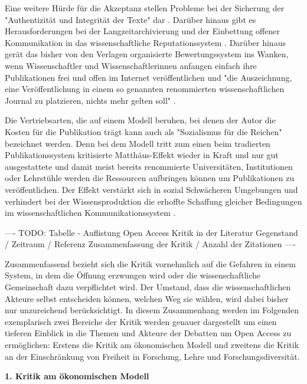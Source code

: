 Eine weitere Hürde für die Akzeptanz stellen Probleme bei der Sicherung der "Authentizität und Integrität der Texte" dar \cite{weishaupt_2009_goldenOA} \cite[:191]{Fehling_2014}. Darüber hinaus gibt es Herausforderungen bei der Langzeitarchivierung \cite{hagner_2015_sache_buches} \cite{Martin_2013} und der Einbettung offener Kommunikation in das wissenschaftliche Reputationssystem \cite{weishaupt_2009_goldenOA} \cite{Suber_2002} \cite{Adema_2014_open_access}. Darüber hinaus gerät das bisher von den Verlagen organisierte Bewertungssystem ins Wanken, wenn Wissenschaftler und Wissenschaftlerinnen anfangen einfach ihre Publikationen frei und offen im Internet veröffentlichen und "die Auszeichnung, eine Veröffentlichung in einem so genannten renommierten wissenschaftlichen Journal zu platzieren, nichts mehr gelten soll" \cite{Schirmbacher_oa_2007}.

Die Vertriebsarten, die auf einem Modell beruhen, bei denen der Autor die Kosten für die Publikation trägt kann auch als "Sozialismus für die Reichen" \cite{cope2014future} bezeichnet werden. Denn bei dem Modell tritt zum einen beim tradierten Publikationssystem kritisierte Matthäus-Effekt wieder in Kraft und nur gut ausgestattete und damit meist bereits renommierte Universitäten, Institutionen oder Lehrstühle werden die Ressourcen aufbringen können um Publikationen zu veröffentlichen. Der Effekt verstärkt sich in sozial Schwächeren Umgebungen und verhindert bei der Wissensproduktion die erhoffte Schaffung gleicher Bedingungen im wissenschaftlichen Kommunikationssystem \cite{suchen}.

---- TODO: Tabelle - Auflistung Open Access Kritik in der Literatur Gegenstand / Zeitraum / Referenz Zusammenfassung der Kritik / Anzahl der Zitationen ----

Zusammenfassend bezieht sich die Kritik vornehmlich auf die Gefahren in einem System, in dem die Öffnung erzwungen wird oder die wissenschaftliche Gemeinschaft dazu verpflichtet wird. Der Umstand, dass die wissenschaftlichen Akteure selbst entscheiden können, welchen Weg sie wählen, wird dabei bisher nur unzureichend berücksichtigt. In diesem Zusammenhang werden im Folgenden exemplarisch zwei Bereiche der Kritik werden genauer dargestellt um einen tieferen Einblick in die Themen und Akteure der Debatten um Open Access zu ermöglichen: Erstens die Kritik am ökonomischen Modell und zweitens die Kritik an der Einschränkung von Freiheit in Forschung, Lehre und Forschungsdiversität.

\textbf{1. Kritik am ökonomischen Modell}

